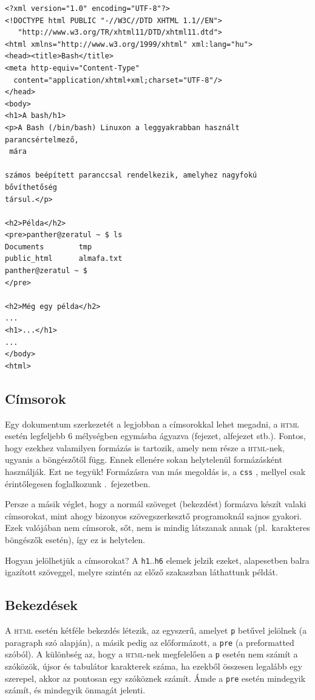 \begin{Verbatim}[frame=single]
<?xml version="1.0" encoding="UTF-8"?>
<!DOCTYPE html PUBLIC "-//W3C//DTD XHTML 1.1//EN">
   "http://www.w3.org/TR/xhtml11/DTD/xhtml11.dtd">
<html xmlns="http://www.w3.org/1999/xhtml" xml:lang="hu">
<head><title>Bash</title>
<meta http-equiv="Content-Type"
  content="application/xhtml+xml;charset="UTF-8"/>
</head>
<body>
<h1>A bash/h1>
<p>A Bash (/bin/bash) Linuxon a leggyakrabban használt parancsértelmező,
 mára

számos beépített paranccsal rendelkezik, amelyhez nagyfokú bővíthetőség
társul.</p>

<h2>Példa</h2>
<pre>panther@zeratul ~ $ ls
Documents        tmp
public_html      almafa.txt
panther@zeratul ~ $
</pre>

<h2>Még egy példa</h2>
...
<h1>...</h1>
...
</body>
<html>
\end{Verbatim}

\subsection{Címsorok}
Egy dokumentum szerkezetét a legjobban a címsorokkal lehet megadni, a
\textsc{html} esetén legfeljebb 6 mélységben egymásba ágyazva (fejezet,
alfejezet stb.). Fontos, hogy ezekhez valamilyen formázás is tartozik, amely nem
része a \textsc{html}-nek, ugyanis a böngészőtől függ. Ennek ellenére sokan
helytelenül formázásként használják. Ezt ne tegyük! Formázásra van más megoldás
is, a \texttt{css} \cite{css}, mellyel csak érintőlegesen foglalkozunk
.\ fejezetben. 

Persze a másik véglet, hogy a normál szöveget (bekezdést) formázva készít valaki
címsorokat, mint ahogy bizonyos szövegszerkesztő programoknál sajnos
gyakori. Ezek valójában  nem címsorok, sőt, nem is mindig látszanak annak (pl.\
karakteres böngészők esetén), így ez is helytelen.

Hogyan jelölhetjük a címsorokat? A \texttt{h1}..\texttt{h6} elemek jelzik
ezeket, alapesetben balra igazított szöveggel, melyre szintén az előző
szakaszban láthattunk példát. %

\subsection{Bekezdések}
A \textsc{html} esetén kétféle bekezdés létezik, az egyszerű, amelyet \texttt{p}
betűvel jelölnek (a paragraph szó alapján), a másik pedig az előformázott, a
\texttt{pre} (a preformatted szóból). A különbség az, hogy a \textsc{html}-nek
megfelelően a \texttt{p} esetén nem számít a szóközök, újsor és tabulátor
karakterek száma, ha ezekből összesen legalább egy szerepel, akkor az pontosan
egy szóköznek számít. Ámde a \texttt{pre} esetén mindegyik számít, és mindegyik
önmagát jelenti.

